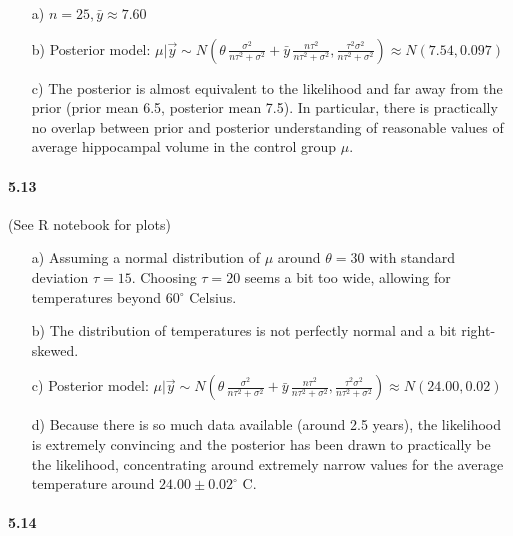 \documentclass[fontsize=11pt,DIV=18,parskip=half]{scrartcl}
\begin{document}
\begin{enumerate}
\item[a)] $n = 25, \bar{y} \approx 7.60$
\item[b)] Posterior model: $\mu|\vec{y} \sim N\left(\theta \, \frac{\sigma^2}{n\tau^2+\sigma^2} + \bar{y} \, \frac{n \tau^2}{n\tau^2+\sigma^2}, \frac{\tau^2 \sigma^2}{n\tau^2+\sigma^2}\right) \approx N\left(7.54, 0.097\right)$
\item[c)] The posterior is almost equivalent to the likelihood and far away from the prior (prior mean 6.5, posterior mean 7.5). In particular, there is practically no overlap between prior and posterior understanding of reasonable values of average hippocampal volume in the control group $\mu$. 
\end{enumerate}

\paragraph{5.13} (See R notebook for plots)

\begin{enumerate}
\item[a)] Assuming a normal distribution of $\mu$ around $\theta=30$ with standard deviation $\tau=15$. Choosing $\tau=20$ seems a bit too wide, allowing for temperatures beyond 60$^\circ$ Celsius.
\item[b)] The distribution of temperatures is not perfectly normal and a bit right-skewed.
\item[c)] Posterior model: $\mu|\vec{y} \sim N\left(\theta \, \frac{\sigma^2}{n\tau^2+\sigma^2} + \bar{y} \, \frac{n \tau^2}{n\tau^2+\sigma^2}, \frac{\tau^2 \sigma^2}{n\tau^2+\sigma^2}\right) \approx N\left(24.00, 0.02\right)$
\item[d)] Because there is so much data available (around 2.5 years), the likelihood is extremely convincing and the posterior has been drawn to practically be the likelihood, concentrating around extremely narrow values for the average temperature around $24.00\pm0.02^\circ$ C.
\end{enumerate}


\paragraph{5.14}
\end{document}
